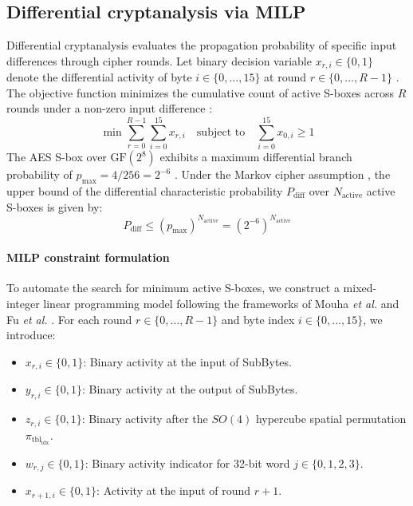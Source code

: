 \documentclass[review,12pt]{elsarticle}
\begin{document}
\subsection{Differential cryptanalysis via MILP}
Differential cryptanalysis evaluates the propagation probability of specific input differences through cipher rounds. Let binary decision variable $x_{r, i} \in \{0, 1\}$ denote the differential activity of byte $i \in \{0, \dots, 15\}$ at round $r \in \{0, \dots, R-1\}$ \cite{mouha2011differential}. The objective function minimizes the cumulative count of active S-boxes across $R$ rounds under a non-zero input difference \cite{mouha2011differential, fu2016milp}:
\begin{equation}
    \min \sum_{r=0}^{R-1} \sum_{i=0}^{15} x_{r, i} \quad \text{subject to} \quad \sum_{i=0}^{15} x_{0, i} \ge 1
\end{equation}
The AES S-box over $\text{GF}(2^8)$ exhibits a maximum differential branch probability of $p_{\max} = 4/256 = 2^{-6}$ \cite{daemen2002design}. Under the Markov cipher assumption \cite{lai1991markov}, the upper bound of the differential characteristic probability $P_{\text{diff}}$ over $N_{\text{active}}$ active S-boxes is given by:
\begin{equation}
    P_{\text{diff}} \le (p_{\max})^{N_{\text{active}}} = \left(2^{-6}\right)^{N_{\text{active}}}
\end{equation}

\paragraph{MILP constraint formulation}
To automate the search for minimum active S-boxes, we construct a mixed-integer linear programming model following the frameworks of Mouha \textit{et al.} \cite{mouha2011differential} and Fu \textit{et al.} \cite{fu2016milp}. For each round $r \in \{0, \dots, R-1\}$ and byte index $i \in \{0, \dots, 15\}$, we introduce:
\begin{itemize}
    \item $x_{r, i} \in \{0, 1\}$: Binary activity at the input of SubBytes.
    \item $y_{r, i} \in \{0, 1\}$: Binary activity at the output of SubBytes.
    \item $z_{r, i} \in \{0, 1\}$: Binary activity after the $SO(4)$ hypercube spatial permutation $\pi_{\text{tbl}_{\text{idx}}}$.
    \item $w_{r, j} \in \{0, 1\}$: Binary activity indicator for 32-bit word $j \in \{0, 1, 2, 3\}$.
    \item $x_{r+1, i} \in \{0, 1\}$: Activity at the input of round $r+1$.
\end{itemize}
\end{document}
